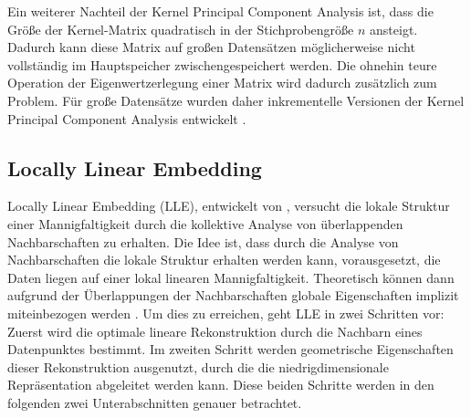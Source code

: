 Ein weiterer Nachteil der Kernel Principal Component Analysis ist, dass die Größe der Kernel-Matrix
quadratisch in der Stichprobengröße $n$ ansteigt. Dadurch kann diese Matrix auf großen Datensätzen
möglicherweise nicht vollständig im Hauptspeicher zwischengespeichert werden. Die ohnehin teure
Operation der Eigenwertzerlegung einer Matrix wird dadurch zusätzlich zum Problem. Für große
Datensätze wurden daher inkrementelle Versionen der Kernel Principal Component Analysis entwickelt \parencite[siehe z.B.][]{Hallgren.2018}.

\subsection{Locally Linear Embedding}
\label{ch:MethodenDerDimRed:statistisch:LLE}
Locally Linear Embedding (LLE), entwickelt von \textcite{Roweis.2000}, versucht die lokale Struktur einer Mannigfaltigkeit durch die kollektive Analyse von überlappenden Nachbarschaften zu erhalten. Die Idee ist, dass durch die Analyse von Nachbarschaften die lokale Struktur erhalten werden kann, vorausgesetzt, die Daten liegen auf einer lokal linearen Mannigfaltigkeit. Theoretisch können dann aufgrund der Überlappungen der Nachbarschaften globale Eigenschaften implizit miteinbezogen werden \parencite[2325]{Roweis.2000}. Um dies zu erreichen, geht LLE in zwei Schritten vor: Zuerst wird die
optimale lineare Rekonstruktion durch die Nachbarn eines Datenpunktes bestimmt. Im zweiten Schritt
werden geometrische Eigenschaften dieser Rekonstruktion ausgenutzt, durch die die
niedrigdimensionale Repräsentation abgeleitet werden kann. Diese beiden Schritte werden in den
folgenden zwei Unterabschnitten genauer betrachtet.

